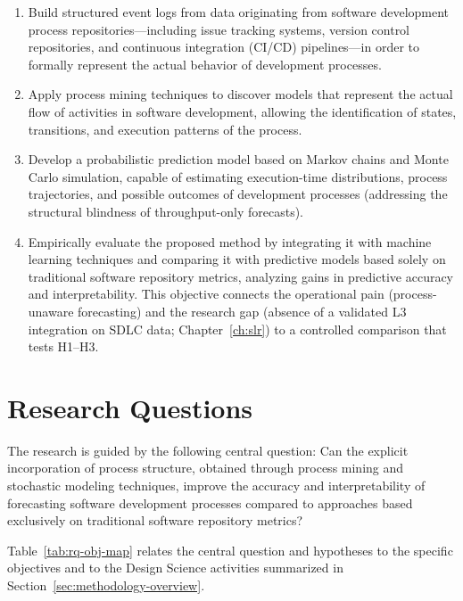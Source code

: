 \begin{enumerate}
    \item Build structured event logs from data originating from software
    development process repositories---including issue tracking systems,
    version control repositories, and continuous integration
    (CI/CD) pipelines---in order to formally represent the actual
    behavior of development processes.

    \item Apply process mining techniques to discover models that
    represent the actual flow of activities in software development,
    allowing the identification of states, transitions, and execution
    patterns of the process.

    \item Develop a probabilistic prediction model based on Markov chains
    and Monte Carlo simulation, capable of estimating execution-time
    distributions, process trajectories, and possible outcomes of
    development processes (addressing the structural blindness of
    throughput-only forecasts).

    \item Empirically evaluate the proposed method by integrating it with
    machine learning techniques and comparing it with predictive models
    based solely on traditional software repository metrics, analyzing
    gains in predictive accuracy and interpretability.
    This objective connects the operational pain (process-unaware
    forecasting) and the research gap (absence of a validated L3
    integration on SDLC data; Chapter~\ref{ch:slr}) to a controlled
    comparison that tests H1--H3.
\end{enumerate}


\section{Research Questions}
\label{sec:rqs}

The research is guided by the following central question:
Can the explicit incorporation of process structure, obtained through
process mining and stochastic modeling techniques, improve the accuracy
and interpretability of forecasting software development processes
compared to approaches based exclusively on traditional software
repository metrics?

Table~\ref{tab:rq-obj-map} relates the central question and hypotheses to
the specific objectives and to the Design Science activities summarized
in Section~\ref{sec:methodology-overview}.

